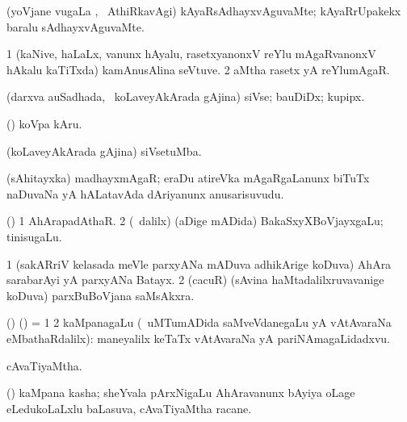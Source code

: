 \bentry
{} 
\gl{\kirxvi}
\expl{}
\bmng
 (yoVjane \mo vugaLa \vi, \kanmu\ AthiRkavAgi) kAyaRsAdhayxvAguvaMte; kAyaRrUpakekx baralu sAdhayxvAguvaMte. 
\emng
\eentry

\bentry
{} 
\gl{\nA}
\expl{}
\bmng
\bnum
\num{1} (kaNive, haLaLx, \mo vanunx hAyalu, rasetxyanonxV reYlu mAgaRvanonxV hAkalu kaTiTxda) kamAnusAlina seVtuve. 
\num{2} aMtha rasetx yA reYlumAgaR. 
\enum
\emng
\eentry

\bentry
{} 
\gl{\nA}
\expl{}
\bmng
 (darxva auSadhada, \sA\ koLaveyAkArada gAjina) siVse; bauDiDx; kupipx. 
\emng

\noindent
\gl{\pagu}
\bmng
{} (\AmA) koVpa kAru. 
\emng
\eentry

\bentry
{} 
\gl{\nA}
\bmng
 (koLaveyAkArada gAjina) siVsetuMba. 
\emng
\eentry

\bentry 
{} 
\gl{\nA}
\expl{\Latin}
\bmng
 (sAhitayxka) madhayxmAgaR; eraDu atireVka mAgaRgaLanunx biTuTx naDuvaNa yA hALatavAda dAriyanunx anusarisuvudu. 
\emng
\eentry

\bentry
{} 
\gl{\nA}
\expl{}
\bmng
 (\aupa) 
\bnum
\num{1} AhArapadAthaR. 
\num{2} (\sA\ \bava dalilx) (aDige mADida) BakaSxyXBoVjayxgaLu; tinisugaLu. 
\enum
\emng
\eentry

\bentry
{} 
\gl{\nA}
\bmng
\bnum
\num{1} (sakARriV kelasada meVle parxyANa mADuva adhikArige koDuva) AhAra sarabarAyi yA parxyANa Batayx. 
\num{2} (cacuR) (sAvina haMtadalilxruvavanige koDuva) parxBuBoVjana saMsAkxra. 
\enum
\emng
\eentry

\bentry
{} 
\gl{\nA}
\expl{}
\bmng
(\bava) (\AmA) = 
\bnum
\num{1}  
\num{2} kaMpanagaLu (\kanmu\ uMTumADida saMveVdanegaLu yA vAtAvaraNa eMbathaRdalilx):  maneyalilx keTaTx vAtAvaraNa yA pariNAmagaLidadxvu. 
\enum
\emng
\eentry

\bentry
{} 
\gl{\gu}
\expl{}
\bmng
 cAvaTiyaMtha. 
\emng
\eentry

\bentry
{} 
\gl{\nA}
\bmng
 (\pArxvi) kaMpana kasha; sheYvala pArxNigaLu AhAravanunx bAyiya oLage eLedukoLaLxlu baLasuva, cAvaTiyaMtha racane.  
\emng
\eentry

